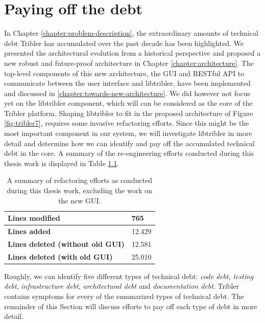 \chapter{Paying off the debt}
\label{chapter:refactoring}
In Chapter \ref{chapter:problem-description}, the extraordinary amounts of technical debt Tribler has accumulated over the past decade has been highlighted. We presented the architectural evolution from a historical perspective and proposed a new robust and future-proof architecture in Chapter \ref{chapter:architecture}. The top-level components of this new architecture, the GUI and RESTful API to communicate between the user interface and libtribler, have been implemented and discussed in \ref{chapter:towards-new-architecture}. We did however not focus yet on the libtribler component, which will can be considered as the core of the Tribler platform. Shaping libtribler to fit in the proposed architecture of Figure \ref{fig:tribler7}, requires some invasive refactoring efforts. Since this might be the most important component in our system, we will investigate libtribler in more detail and determine how we can identify and pay off the accumulated technical debt in the core. A summary of the re-engineering efforts conducted during this thesis work is displayed in Table \ref{table:refactoring-summary}.\\

\begin{table}[h!]
	\centering
	\begin{tabular}{|l|l|}
		\hline
		\textbf{Lines modified} & 765 \\ \hline
		\textbf{Lines added} & 12.429 \\ \hline
		\textbf{Lines deleted (without old GUI)} & 12.581 \\ \hline
		\textbf{Lines deleted (with old GUI)} & 25.010 \\ \hline
	\end{tabular}
	\caption{A summary of refactoring efforts as conducted during this thesis work, excluding the work on the new GUI.}
	\label{table:refactoring-summary}
\end{table}

Roughly, we can identify five different types of technical debt\cite{seaman2011measuring}: \emph{code debt}, \emph{testing debt}, \emph{infrastructure debt}, \emph{architectural debt} and \emph{documentation debt}. Tribler contains symptoms for every of the summarized types of technical debt. The remainder of this Section will discuss efforts to pay off each type of debt in more detail.

